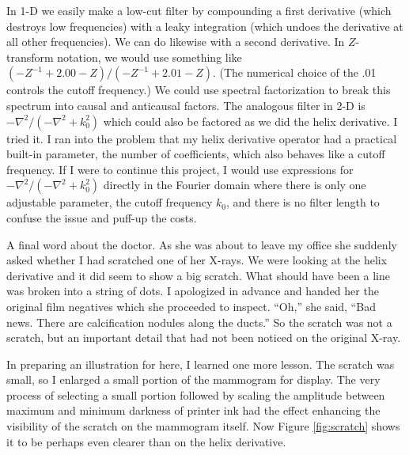 \par
In 1-D we easily make a low-cut filter
by compounding a first derivative (which destroys low frequencies)
with a leaky integration (which undoes the derivative at all other frequencies).
We can do likewise with a second derivative.
In $Z$-transform notation, we would use something like
$ (-Z^{-1} + 2.00 - Z) / (-Z^{-1} + 2.01 - Z)$.
(The numerical choice of the .01 controls the cutoff frequency.)
We could use spectral factorization to break this spectrum into
causal and anticausal factors.
The analogous filter in 2-D is
$-\nabla^2 /(-\nabla^2 + k_0^2)$
which could also be factored as we did the helix derivative.
I tried it.
I ran into the problem that my helix derivative operator
had a practical built-in parameter, the number of coefficients,
which also behaves like a cutoff frequency.
If I were to continue this project,
I would use expressions for
$-\nabla^2 /(-\nabla^2 + k_0^2)$
directly in the Fourier domain where there is only one adjustable parameter,
the cutoff frequency $k_0$,
and there is no filter length to confuse the issue and puff-up the costs.


\par
A final word about the doctor.
As she was about to leave my office she suddenly asked
whether I had scratched one of her X-rays.
We were looking at the helix derivative
and it did seem to show a big scratch.
What should have been a line was broken into a string of dots.
I apologized in advance and handed her the original film negatives
which she proceeded to inspect.
``Oh,'' she said,
``Bad news. There are calcification nodules along the ducts.''
So the scratch was not a scratch,
but an important detail that had not been noticed on the original X-ray.

\par
In preparing an illustration for here,
I learned one more lesson.
The scratch was small,
so I enlarged a small portion of the mammogram for display.
The very process of selecting a small portion
followed by scaling the amplitude
between maximum and minimum darkness of printer ink
had the effect enhancing the visibility of the scratch on
the mammogram itself.
Now Figure \ref{fig:scratch} shows it to be
perhaps even clearer than on the helix derivative.

\begin{comment}
\par
An operator for applying the helix filter is
\texttt{helderiv} \vpageref{lst:helderiv}.
\opdex{helderiv}{helix-derivative filter}
\end{comment}

